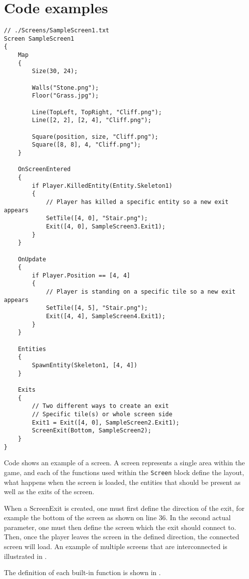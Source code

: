 \section{Code examples}

\begin{lstlisting}[caption={Example screen.}, label={lst:SampleScreen1},escapechar=|]
// ./Screens/SampleScreen1.txt
Screen SampleScreen1 
{
    Map 
    {
        Size(30, 24);

        Walls("Stone.png"); 
        Floor("Grass.jpg");

        Line(TopLeft, TopRight, "Cliff.png");
        Line([2, 2], [2, 4], "Cliff.png");

        Square(position, size, "Cliff.png");
        Square([8, 8], 4, "Cliff.png");
    }

    OnScreenEntered
    {
        if Player.KilledEntity(Entity.Skeleton1) 
        {
            // Player has killed a specific entity so a new exit appears
            SetTile([4, 0], "Stair.png");
            Exit([4, 0], SampleScreen3.Exit1);
        }
    }

    OnUpdate
    {
        if Player.Position == [4, 4] 
        {
            // Player is standing on a specific tile so a new exit appears
            SetTile([4, 5], "Stair.png");
            Exit([4, 4], SampleScreen4.Exit1);
        }
    }

    Entities
    {
        SpawnEntity(Skeleton1, [4, 4])
    }
    
    Exits 
    {
        // Two different ways to create an exit
        // Specific tile(s) or whole screen side
        Exit1 = Exit([4, 0], SampleScreen2.Exit1);
        ScreenExit(Bottom, SampleScreen2);
    }
}
\end{lstlisting}

Code  shows an example of a screen. A screen represents a single area within the game, and each of the functions used within the \texttt{Screen} block define the layout, what happens when the screen is loaded, the entities that should be present as well as the exits of the screen. 

When a ScreenExit is created, one must first define the direction of the exit, for example the bottom of the screen as shown on line 36.
In the second actual parameter, one must then define the screen which the exit should connect to.
Then, once the player leaves the screen in the defined direction, the connected screen will load. An example of multiple screens that are interconnected is illustrated in .


The definition of each built-in function is shown in .